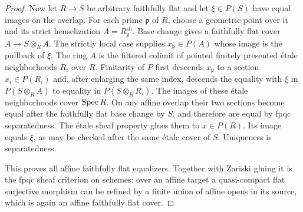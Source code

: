 \begin{proof}
Now let $R\to S$ be arbitrary faithfully flat and let
$\xi\in P(S)$ have equal images on the overlap.  For each prime
$\mathfrak p$ of $R$, choose a geometric point over it and its
strict henselization $A=R_{\mathfrak p}^{\mathrm{sh}}$.
Base change gives a faithfully flat cover $A\to S\otimes_R A$.
The strictly local case supplies $x_{\mathfrak p}\in P(A)$
whose image is the pullback of $\xi$.
The ring $A$ is the filtered colimit of pointed finitely presented
\'etale neighborhoods $R_i$ over $R$.  Finitarity of $P$ first
descends $x_{\mathfrak p}$ to a section $x_i\in P(R_i)$ and,
after enlarging the same index, descends the equality with $\xi$
in $P(S\otimes_R A)$ to equality in $P(S\otimes_R R_i)$.
The images of these \'etale neighborhoods cover $\operatorname{Spec} R$.
On any affine overlap their two sections become equal after the
faithfully flat base change by $S$, and therefore are equal by
fpqc separatedness.  The \'etale sheaf property glues them to
$x\in P(R)$.  Its image equals $\xi$, as may be checked after
the same \'etale cover of $S$.  Uniqueness is separatedness.

This proves all affine faithfully flat equalizers.  Together
with Zariski gluing it is the fpqc sheaf criterion on schemes:
over an affine target a quasi-compact flat surjective morphism
can be refined by a finite union of affine opens in its source,
which is again an affine faithfully flat cover.
\end{proof}

